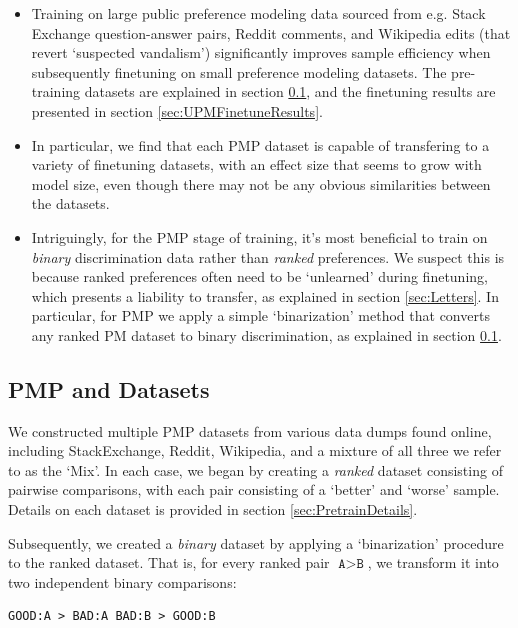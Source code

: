 \begin{itemize}
    \item Training on large public preference modeling data sourced from e.g. Stack Exchange question-answer pairs, Reddit comments, and Wikipedia edits (that revert `suspected vandalism') significantly improves sample efficiency when subsequently finetuning on small preference modeling datasets.  The pre-training datasets are explained in section \ref{sec:UPMPretrainDataset}, and the finetuning results are presented in section \ref{sec:UPMFinetuneResults}.
    \item
    In particular, we find that each PMP dataset is capable of transfering to a variety of finetuning datasets, with an effect size that seems to grow with model size, even though there may not be any obvious similarities between the datasets. 
    \item Intriguingly, for the PMP stage of training, it's most beneficial to train on {\it binary} discrimination data rather than {\it ranked} preferences.  We suspect this is because ranked preferences often need to be `unlearned' during finetuning, which presents a liability to transfer, as explained in section \ref{sec:Letters}. In particular, for PMP we apply a simple `binarization' method that converts any ranked PM dataset to binary discrimination, as explained in section \ref{sec:UPMPretrainDataset}.
\end{itemize}

\subsection{PMP and Datasets}
\label{sec:UPMPretrainDataset}

 We constructed multiple PMP datasets from various data dumps found online, including StackExchange, Reddit, Wikipedia, and a mixture of all three we refer to as  the `Mix'. In each case, we began by creating a {\it ranked} dataset consisting of pairwise comparisons, with each pair consisting of a `better' and `worse' sample. Details on each dataset is provided in section \ref{sec:PretrainDetails}. 

Subsequently, we created a {\it binary} dataset by applying a `binarization' procedure to the ranked dataset. That is, for every ranked pair $\texttt{A} > \texttt{B}$, we transform it into two independent binary comparisons:

\begin{verbatim}
GOOD:A > BAD:A BAD:B > GOOD:B
\end{verbatim}

